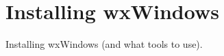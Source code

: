 \chapter{Installing wxWindows}\label{chapinstall}
%
%
\setfooter{\thepage}{}{}{}{}{\thepage}%

Installing wxWindows (and what tools to use).

